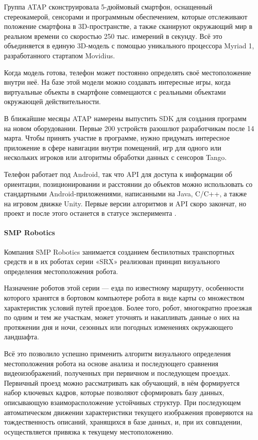Группа ATAP сконструировала 5-дюймовый смартфон, оснащенный стереокамерой, сенсорами и программным обеспечением, которые отслеживают положение смартфона в 3D-пространстве, а также сканируют окружающий мир в реальном времени со скоростью 250 тыс. измерений в секунду. Всё это объединяется в единую 3D-модель с помощью уникального процессора Myriad 1, разработанного стартапом Movidius.

Когда модель готова, телефон может постоянно определять своё местоположение внутри неё. На базе этой модели можно создавать интересные игры, когда виртуальные объекты в смартфоне совмещаются с реальными объектами окружающей действительности. 

В ближайшие месяцы ATAP намерены выпустить SDK для создания программ на новом оборудовании. Первые 200 устройств разошлют разработчикам после 14 марта. Чтобы принять участие в программе, нужно придумать интересное приложение в сфере навигации внутри помещений, игр для одного или нескольких игроков или алгоритмы обработки данных с сенсоров Tango.

Телефон работает под Android, так что API для доступа к информации об ориентации, позиционировании и расстоянии до объектов можно использовать со стандартными Android-приложениями, написанными на Java, C/C++, а также на игровом движке Unity. Первые версии алгоритмов и API скоро закончат, но проект и после этого останется в статусе эксперимента \cite{habrTango}\cite{googleTango}.

\paragraph{SMP Robotics}
Компания SMP Robotics занимается созданием беспилотных транспортных средств и в их роботах серии «SRX» реализован принцип визуального определения местоположения робота.

Назначение роботов этой серии — езда по известному маршруту, особенности которого хранятся в бортовом компьютере робота в виде карты со множеством характеристик условий путей проездов. Более того, робот, многократно проезжая по одним и тем же участкам, может уточнять и накапливать данные о них на протяжении дня и ночи, сезонных или погодных изменениях окружающего ландшафта.

Всё это позволило успешно применить алгоритм визуального определения местоположения робота на основе анализа и последующего сравнения видеоизображений, полученных при первичном и последующем проездах. Первичный проезд можно рассматривать как обучающий, в нём формируется набор ключевых кадров, которые позволяют сформировать базу данных, описывающую взаиморасположение устойчивых структур. При последующем автоматическом движении характеристики текущего изображения проверяются на тождественность описаний, хранящихся в базе данных, и, при их совпадении, осуществляется привязка к текущему местоположению.

